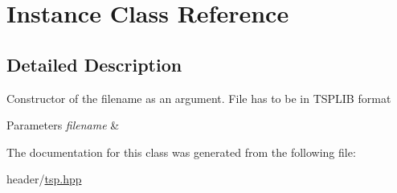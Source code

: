 \hypertarget{classInstance}{}\section{Instance Class Reference}
\label{classInstance}


\subsection{Detailed Description}
Constructor of the filename as an argument. File has to be in T\+S\+P\+L\+IB format 
\begin{DoxyParams}{Parameters}
{\em filename} & \\
\hline
\end{DoxyParams}


The documentation for this class was generated from the following file\+:\begin{DoxyCompactItemize}
\item 
header/\hyperlink{tsp_8hpp}{tsp.\+hpp}\end{DoxyCompactItemize}

